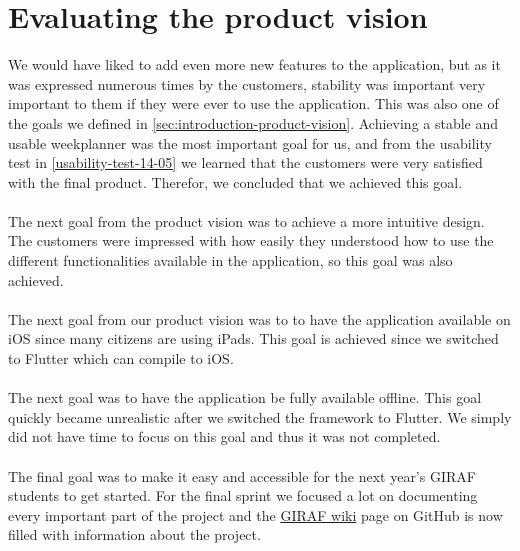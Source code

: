 \section{Evaluating the product vision}
We would have liked to add even more new features to the application, but as it was expressed numerous times by the customers, stability was important very important to them if they were ever to use the application.
This was also one of the goals we defined in \autoref{sec:introduction-product-vision}.
Achieving a stable and usable weekplanner was the most important goal for us, and from the usability test in \autoref{usability-test-14-05} we learned that the customers were very satisfied with the final product.
Therefor, we concluded that we achieved this goal. 
\\\\
The next goal from the product vision was to achieve a more intuitive design.
The customers were impressed with how easily they understood how to use the different functionalities available in the application, so this goal was also achieved.
\\\\
The next goal from our product vision was to to have the application available on iOS since many citizens are using iPads.
This goal is achieved since we switched to Flutter which can compile to iOS.
\\\\
The next goal was to have the application be fully available offline.
This goal quickly became unrealistic after we switched the framework to Flutter.
We simply did not have time to focus on this goal and thus it was not completed.
\\\\
The final goal was to make it easy and accessible for the next year's GIRAF students to get started.
For the final sprint we focused a lot on documenting every important part of the project and the \href{https://github.com/aau-giraf/wiki}{GIRAF wiki} page on GitHub is now filled with information about the project. 
